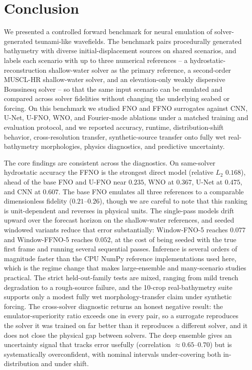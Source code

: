 \section{Conclusion}
\label{sec:conclusion}

We presented a controlled forward benchmark for neural emulation of solver-generated tsunami-like wavefields. The benchmark pairs procedurally generated bathymetry with diverse initial-displacement sources on shared scenarios, and labels each scenario with up to three numerical references -- a hydrostatic-reconstruction shallow-water solver as the primary reference, a second-order MUSCL-HR shallow-water solver, and an elevation-only weakly dispersive Boussinesq solver -- so that the same input scenario can be emulated and compared across solver fidelities without changing the underlying seabed or forcing. On this benchmark we studied FNO and FFNO surrogates against CNN, U-Net, U-FNO, WNO, and Fourier-mode ablations under a matched training and evaluation protocol, and we reported accuracy, runtime, distribution-shift behavior, cross-resolution transfer, synthetic-source transfer onto fully wet real-bathymetry morphologies, physics diagnostics, and predictive uncertainty.

The core findings are consistent across the diagnostics. On same-solver hydrostatic accuracy the FFNO is the strongest direct model (relative $L_2$ $0.168$), ahead of the base FNO and U-FNO near $0.235$, WNO at $0.367$, U-Net at $0.475$, and CNN at $0.607$. The base FNO emulates all three references to a comparable dimensionless fidelity ($0.21$--$0.26$), though we are careful to note that this ranking is unit-dependent and reverses in physical units. The single-pass models drift upward over the forecast horizon on the shallow-water references, and seeded windowed variants reduce that error substantially: Window-FNO-5 reaches $0.077$ and Window-FFNO-5 reaches $0.052$, at the cost of being seeded with the true first frame and running several sequential passes. Inference is several orders of magnitude faster than the CPU NumPy reference implementations used here, which is the regime change that makes large-ensemble and many-scenario studies practical. The strict held-out-family tests are mixed, ranging from mild trench degradation to a rough-source failure, and the 10-crop real-bathymetry suite supports only a modest fully wet morphology-transfer claim under synthetic forcing. The cross-solver diagnostic returns an honest negative result: the emulator-superiority ratio exceeds one in every pair, so a surrogate reproduces the solver it was trained on far better than it reproduces a different solver, and it does not close the physical gap between solvers. The deep ensemble gives an uncertainty signal that tracks error usefully (correlation $\approx 0.65$--$0.70$) but is systematically overconfident, with nominal intervals under-covering both in-distribution and under shift.

